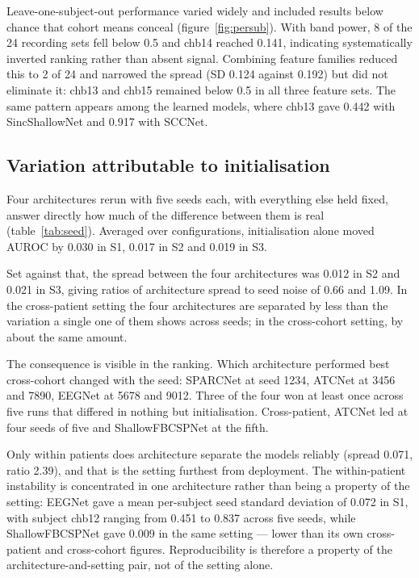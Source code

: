 \documentclass[11pt,a4paper]{article}
\begin{document}
Leave-one-subject-out performance varied widely and included results below
chance that cohort means conceal (figure~\ref{fig:persub}). With band power, 8
of the 24 recording sets fell below 0.5 and chb14 reached 0.141, indicating
systematically inverted ranking rather than absent signal. Combining feature
families reduced this to 2 of 24 and narrowed the spread (SD 0.124 against
0.192) but did not eliminate it: chb13 and chb15 remained below 0.5 in all
three feature sets. The same pattern appears among the learned models, where
chb13 gave 0.442 with SincShallowNet and 0.917 with SCCNet.

\subsection{Variation attributable to initialisation}

Four architectures rerun with five seeds each, with everything else held
fixed, answer directly how much of the difference between them is real
(table~\ref{tab:seed}). Averaged over configurations, initialisation alone
moved AUROC by 0.030 in S1, 0.017 in S2 and 0.019 in S3.

Set against that, the spread between the four architectures was 0.012 in S2
and 0.021 in S3, giving ratios of architecture spread to seed noise of 0.66
and 1.09. In the cross-patient setting the four architectures are separated
by less than the variation a single one of them shows across seeds; in the
cross-cohort setting, by about the same amount.

The consequence is visible in the ranking. Which architecture performed best
cross-cohort changed with the seed: SPARCNet at seed 1234, ATCNet at 3456
and 7890, EEGNet at 5678 and 9012. Three of the four won at least once
across five runs that differed in nothing but initialisation. Cross-patient,
ATCNet led at four seeds of five and ShallowFBCSPNet at the fifth.

Only within patients does architecture separate the models reliably (spread
0.071, ratio 2.39), and that is the setting furthest from deployment. The
within-patient instability is concentrated in one architecture rather than
being a property of the setting: EEGNet gave a mean per-subject seed
standard deviation of 0.072 in S1, with subject chb12 ranging from 0.451 to
0.837 across five seeds, while ShallowFBCSPNet gave 0.009 in the same
setting --- lower than its own cross-patient and cross-cohort figures.
Reproducibility is therefore a property of the architecture-and-setting
pair, not of the setting alone.
\end{document}

